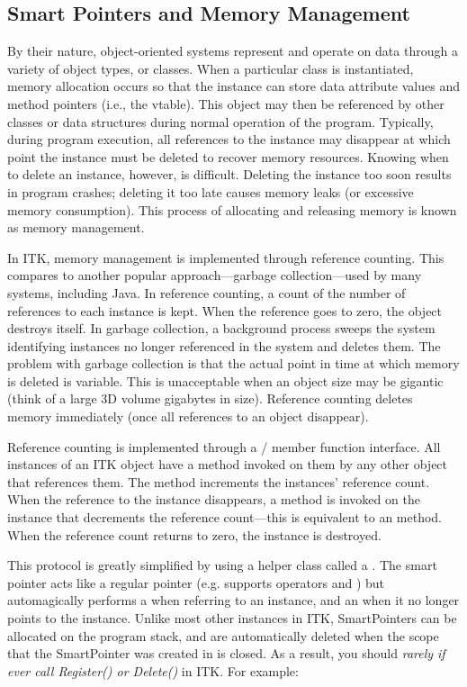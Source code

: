 \subsection{Smart Pointers and Memory Management}%
\label{sec:SmartPointers}%

By their nature, object-oriented systems represent and operate on data through
a variety of object types, or classes. When a particular class is
instantiated, memory allocation occurs so that the instance can store data
attribute values and method pointers (i.e., the vtable).
This object may then be referenced by other classes or
data structures during normal operation of the program. Typically, during
program execution, all references to the instance may disappear at which point
the instance must be deleted to recover memory resources. Knowing when to
delete an instance, however, is difficult. Deleting the instance too soon
results in program crashes; deleting it too late causes memory leaks (or
excessive memory consumption). This process of allocating and
releasing memory is known as memory management.

In ITK, memory management is implemented through reference counting. This
compares to another popular approach---garbage collection---used%
 by many systems, including Java.
In reference counting, a count of the number of
references to each instance is kept. When the reference goes to zero, the
object destroys itself. In garbage collection, a background process sweeps
the system identifying instances no longer referenced in the system and
deletes them. The problem with garbage collection is that the actual point in
time at which memory is deleted is variable. This is unacceptable when an
object size may be gigantic (think of a large 3D volume gigabytes in
size). Reference counting deletes memory immediately (once all references to
an object disappear).

Reference counting is implemented through a /
member function interface. All instances of an ITK object have a
 method invoked on them by any other object that references
them. The  method increments the instances' reference
count. When the reference to the instance disappears, a 
method is invoked on the instance that decrements the reference count---this
is equivalent to an  method. When the reference count
returns to zero, the instance is destroyed.

This protocol is greatly simplified by using a helper class called a
. The smart pointer acts like a regular pointer
(e.g. supports operators \code{->} and \code{*}) but automagically performs a
 when referring to an instance, and an 
when it no longer points to the instance. Unlike most other instances in
ITK, SmartPointers can be allocated on the program stack, and are
automatically deleted when the scope that the SmartPointer was created in
is closed. As a result, you should \emph{rarely if ever call Register() or
Delete()} in ITK. For example:

